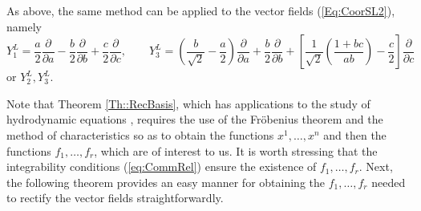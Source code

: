 \documentclass[12pt]{article}
\theoremstyle{plain}
\theoremstyle{definition}
\numberwithin{equation}{section}
\begin{document}
As above, the same method can be applied to the vector fields (\ref{Eq:CoorSL2}), namely
$$
Y_1^L=\frac a2\frac{\partial}{\partial a}-\frac b2 \frac{\partial }{\partial b}+\frac c2 \frac{\partial}{\partial c},\qquad Y_3^L=\left(\frac b{\sqrt{2}}-\frac a2\right)\frac{\partial}{\partial a}+\frac b2 \frac{\partial }{\partial b}+\left[\frac 1{\sqrt{2}}\left(\frac{1+bc}{ab}\right)-\frac c2\right] \frac{\partial}{\partial c}
$$
or $Y_2^L,Y_3^L$.


Note that Theorem \ref{Th::RecBasis}, which has applications to the study of hydrodynamic equations \cite{Gr23}, requires the use of the Fr\"obenius theorem and the method of characteristics so as to obtain the functions $x^1,\ldots,x^n$ and then the functions $f_1,\ldots, f_r$, which are of interest to us. It is worth stressing that the integrability conditions (\ref{eq:CommRel}) ensure the existence of $f_1,\ldots,f_r$. Next, the following theorem provides an easy manner for obtaining the $f_1,\ldots,f_r$ needed to rectify the vector fields straightforwardly.
\end{document}
